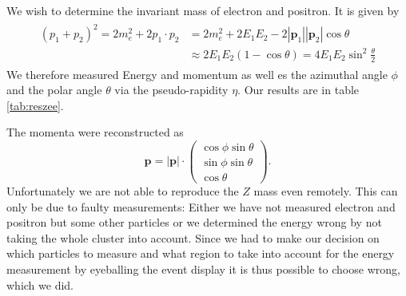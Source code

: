 \documentclass[11pt,a4paper,notitlepage]{scrartcl}
\begin{document}
We wish to determine the invariant mass of electron and positron. It is given by \begin{align}
	\label{eq:zmass}
	\begin{split}
			(p_1+p_2)^2=2m_e^2+2p_1\cdot p_2&=2m_e^2+2E_1E_2-2|\mathbf{p}_1||\mathbf{p}_2|\cos\theta\\&\approx 2E_1E_2(1-\cos\theta)=4E_1E_2\sin^2\frac{\theta}{2}
	\end{split}
\end{align}
We therefore measured Energy and momentum as well es the azimuthal angle $\phi$ and the polar angle $\theta$ via the pseudo-rapidity $\eta$. Our results are in table \ref{tab:reszee}.
\begin{table}[htbp]
\caption{Results of invariant mass}
\label{tab:reszee}
\end{table} 

The momenta were reconstructed as $$\mathbf{p}=|\mathbf{p}|\cdot
\begin{pmatrix}
\cos\phi\sin\theta\\
\sin\phi\sin\theta\\
\cos\theta	
\end{pmatrix}.$$
Unfortunately we are not able to reproduce the $Z$ mass even remotely. This can only be due to faulty measurements: Either we have not measured electron and positron but some other particles or we determined the energy wrong by not taking the whole cluster into account. Since we had to make our decision on which particles to measure and what region to take into account for the energy measurement by eyeballing the event display it is thus possible to choose wrong, which we did.
\end{document}
